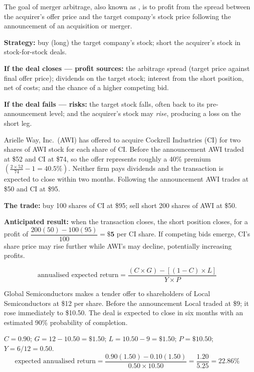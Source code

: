 The goal of merger arbitrage, also known as , is to profit
from the spread between the acquirer's offer price and the target company's stock
price following the announcement of an acquisition or merger.

\begin{imkeybox}[title={The trade, and both sides of the outcome}]
\textbf{Strategy:} buy (long) the target company's stock; short the acquirer's
stock in stock-for-stock deals.

\smallskip
\textbf{If the deal closes --- profit sources:} the arbitrage spread (target price
against final offer price); dividends on the target stock; interest from the short
position, net of costs; and the chance of a higher competing bid.

\smallskip
\textbf{If the deal fails --- risks:} the target stock falls, often back to its
pre-announcement level; and the acquirer's stock may \emph{rise}, producing a loss
on the short leg. 
\end{imkeybox}

\begin{imexbox}[title={Constructing the merger arbitrage trade}]
Arielle Way, Inc.\ (AWI) has offered to acquire Cockrell Industries (CI) for two
shares of AWI stock for each share of CI. Before the announcement AWI traded at
\$52 and CI at \$74, so the offer represents roughly a 40\% premium
$\left(\tfrac{2 \times 52}{74} - 1 = 40.5\%\right)$. Neither firm pays dividends
and the transaction is expected to close within two months. Following the
announcement AWI trades at \$50 and CI at \$95.

\medskip
\textbf{The trade:} buy 100 shares of CI at \$95; sell short 200 shares of AWI at
\$50.

\medskip
\textbf{Anticipated result:} when the transaction closes, the short position
closes, for a profit of
$\dfrac{200(50) - 100(95)}{100} = \mathbf{\$5}$ per CI share. If competing bids
emerge, CI's share price may rise further while AWI's may decline, potentially
increasing profits.
\end{imexbox}

\begin{imexbox}[title={The annualised expected return on a merger arbitrage}]
\[ \text{annualised expected return} = \frac{(C \times G) - \left[(1-C) \times L\right]}{Y \times P} \]

\medskip
Global Semiconductors makes a tender offer to shareholders of Local
Semiconductors at \$12 per share. Before the announcement Local traded at \$9;
it rose immediately to \$10.50. The deal is expected to close in six months with
an estimated 90\% probability of completion.

\medskip
$C = 0.90$; $G = 12 - 10.50 = \$1.50$; $L = 10.50 - 9 = \$1.50$; $P = \$10.50$;
$Y = 6/12 = 0.50$.
\[ \text{expected annualised return}
 = \frac{0.90(1.50) - 0.10(1.50)}{0.50 \times 10.50}
 = \frac{1.20}{5.25} = \mathbf{22.86\%} \]
\end{imexbox}

